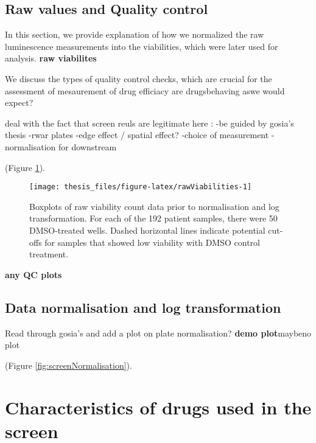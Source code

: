 \documentclass[11pt, a4paper, twosided]{book}
\begin{document}
\hypertarget{raw-values-and-quality-control}{%
\subsection{Raw values and Quality control}\label{raw-values-and-quality-control}}

In this section, we provide explanation of how we normalized the raw luminescence
measurements into the viabilities, which were later used for analysis.
\textbf{raw viabilites}

We discuss the types of quality control checks, which are crucial for the assessment of mesaurement of drug efficiacy
are drugsbehaving aswe would expect?

deal with the fact that screen reuls are legitimate here :
-be guided by gosia's thesis
-rwar plates -edge effect / spatial effect?
-choice of measurement
-normalisation for downstream

(Figure \ref{fig:rawViabilities}).


\begin{figure}

{\centering \texttt{[image: thesis\_files/figure-latex/rawViabilities-1]} 

}

\caption{Boxplots of raw viability count data prior to normalisation and log transformation. For each of the 192 patient samples, there were 50 DMSO-treated wells. Dashed horizontal lines indicate potential cut-offs for samples that showed low viability with DMSO control treatment.}\label{fig:rawViabilities}
\end{figure}
\textbf{any QC plots}

\hypertarget{data-normalisation-and-log-transformation}{%
\subsection{Data normalisation and log transformation}\label{data-normalisation-and-log-transformation}}

Read through gosia's and add a plot on plate normalisation?
\textbf{demo plot}maybeno plot

(Figure \ref{fig:screenNormalisation}).



\hypertarget{drugs}{%
\section{Characteristics of drugs used in the screen}\label{drugs}}
\end{document}
